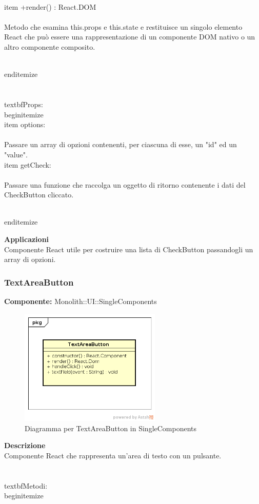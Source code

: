 \\item +render() : React.DOM 
\\\\
Metodo che esamina this.props e this.state e restituisce un singolo elemento React che può essere una rappresentazione di un componente DOM nativo o un altro componente composito.

\\end{itemize}
\\\\
\\textbf{Props:} 
\\begin{itemize}
\\item options: 
\\\\
Passare un array di opzioni contenenti, per ciascuna di esse, un "id" ed un "value".
\\item getCheck: 
\\\\
Passare una funzione che raccolga un oggetto di ritorno contenente i dati del CheckButton cliccato.

\\end{itemize} 


\textbf{Applicazioni}\\
Componente React utile per costruire una lista di CheckButton passandogli un array di opzioni. 


\clearpage

\subsubsection{TextAreaButton}
\textbf{Componente:}  Monolith::UI::SingleComponents\\
   \FloatBarrier
   \begin{figure}[ht]
   \centering
   \includegraphics[width=0.6\textwidth]{img/single-TextAreaButton}
   \caption{{Diagramma per TextAreaButton in SingleComponents}}
\end{figure}
\FloatBarrier
\textbf{Descrizione}\\
Componente React che rappresenta un'area di testo con un pulsante. \\\\
\\textbf{Metodi:} 
\\begin{itemize}

